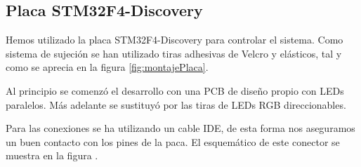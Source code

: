 \subsection{Placa STM32F4-Discovery}
Hemos utilizado la placa STM32F4-Discovery para controlar el sistema. Como
sistema de sujeción se han utilizado tiras adhesivas de Velcro y elásticos, tal
y como se aprecia en la figura \ref{fig:montajePlaca}.

Al principio se comenzó el desarrollo con una PCB de diseño propio con LEDs
paralelos. Más adelante se sustituyó por las tiras de LEDs RGB direccionables.

Para las conexiones se ha utilizando un cable IDE, de esta forma nos aseguramos
un buen contacto con los pines de la paca. El esquemático de este conector se
muestra en la figura .

